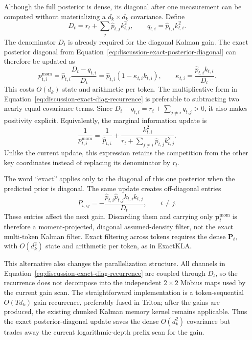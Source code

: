 \documentclass[11pt]{article}
\newcommand{\vct}[1]{\boldsymbol{#1}}
\begin{document}
Although the full posterior is dense, its diagonal after one measurement can be computed without
materializing a $d_k\times d_k$ covariance. Define
\begin{equation}
  D_t
  = r_t+\sum_j\widehat p_{t,j}k_{t,j}^2,
  \qquad
  q_{t,i}=\widehat p_{t,i}k_{t,i}^2.
  \label{eq:discussion-exact-diag-denominator}
\end{equation}
The denominator $D_t$ is already required for the diagonal Kalman gain. The exact posterior
diagonal from Equation~\eqref{eq:discussion-exact-posterior-diagonal} can therefore be updated as
\begin{equation}
  p^{\mathrm{mom}}_{t,i}
  = \widehat p_{t,i}
    \frac{D_t-q_{t,i}}{D_t}
  = \widehat p_{t,i}
    \left(1-\kappa_{t,i}k_{t,i}\right),
  \qquad
  \kappa_{t,i}=\frac{\widehat p_{t,i}k_{t,i}}{D_t}.
  \label{eq:discussion-exact-diag-recurrence}
\end{equation}
This costs $O(d_k)$ state and arithmetic per token. The multiplicative form in
Equation~\eqref{eq:discussion-exact-diag-recurrence} is preferable to subtracting two nearly
equal covariance terms. Since $D_t-q_{t,i}=r_t+\sum_{j\ne i}q_{t,j}>0$, it also makes positivity
explicit. Equivalently, the marginal information update is
\begin{equation}
  \frac{1}{p^{\mathrm{mom}}_{t,i}}
  = \frac{1}{\widehat p_{t,i}}
  + \frac{k_{t,i}^2}
    {r_t+\sum_{j\ne i}\widehat p_{t,j}k_{t,j}^2}.
  \label{eq:discussion-exact-diag-information}
\end{equation}
Unlike the current update, this expression retains the competition from the other key
coordinates instead of replacing its denominator by $r_t$.

The word ``exact'' applies only to the diagonal of this one posterior when the predicted prior is
diagonal. The same update creates off-diagonal entries
\begin{equation}
  P_{t,ij}
  = -\frac{\widehat p_{t,i}\widehat p_{t,j}k_{t,i}k_{t,j}}{D_t},
  \qquad i\ne j.
  \label{eq:discussion-exact-posterior-offdiag}
\end{equation}
These entries affect the next gain. Discarding them and carrying only
$\vct{p}^{\mathrm{mom}}_t$ is therefore a moment-projected, diagonal assumed-density filter, not
the exact multi-token Kalman filter. Exact filtering across tokens requires the dense
$\vct{P}_t$, with $O(d_k^2)$ state and arithmetic per token, as in ExactKLA.

This alternative also changes the parallelization structure. All channels in
Equation~\eqref{eq:discussion-exact-diag-recurrence} are coupled through $D_t$, so the recurrence
does not decompose into the independent $2\times2$ M\"obius maps used by the current gain scan.
The straightforward implementation is a token-sequential $O(Td_k)$ gain recurrence, preferably
fused in Triton; after the gains are produced, the existing chunked Kalman memory kernel remains
applicable. Thus the exact posterior-diagonal update saves the dense $O(d_k^2)$ covariance but
trades away the current logarithmic-depth prefix scan for the gain.
\end{document}
